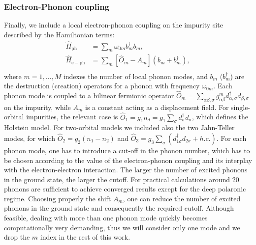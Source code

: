 \documentclass[edipack_sp.tex]{subfiles}
\begin{document}
\subsubsection{Electron-Phonon coupling}
Finally, we include a local electron-phonon coupling on the impurity site
described by the Hamiltonian terms: 
\begin{equation}\label{Hph}
  \begin{split}
    \hat{H}_\mathrm{ph}&=\sum_m \omega_{0m} b_m^\dagger b_m,   \\
    \hat{H}_\mathrm{e-ph} &= \sum_m [ \hat{O}_m - A_m](b_m+b_m^\dagger), \\
\end{split}
\end{equation}
where $m=1,\dots,M$ indexes the number of local phonon modes, and $b_m$
($b_m^\dagger$) are the destruction (creation) operators for a phonon with
frequency $\omega_{0m}$. Each phonon mode is coupled to a bilinear fermionic operator $\hat{O}_m= \sum_{\alpha \beta, \sigma }g^{m}_{\alpha \beta} d^\dagger_{\alpha, \sigma} d_{\beta, \sigma}$ on the impurity, while $A_m$ is a constant acting as a displacement field.  %
For single-orbital impurities, the relevant case is $\hat{O}_1 = g_1 n_d = g_1 \sum_{\sigma} d^{\dagger}_{\sigma}d_{\sigma}$, which defines the Holstein model\cite{Holstein1959APNY}. For two-orbital models we included also the two Jahn-Teller modes\cite{Capone2010ACMP}, for which $\hat{O}_2 = g_2(n_1 - n_2)$\cite{Scazzola2023PRB} and $\hat{O}_3 = g_3 \sum_{\sigma} (d^{\dagger}_{1\sigma}d_{2\sigma}+ h.c.)$. For each phonon mode, one has to introduce a cut-off in the phonon number, which has to be chosen according to the value of the electron-phonon coupling\cite{Capone2003PRL,Capone2006PRB} and its interplay with the electron-electron interaction\cite{Capone2004PRL_2,Sangiovanni2005PRB,Paci2005PRL,Sangiovanni2006PRL,Sangiovanni2006PRB_ph,Paci2006PRB}. The larger the number of excited phonons in the ground state, the larger the cutoff. For practical calculations around 20 phonons are sufficient to achieve converged results except for the deep polaronic regime\cite{Capone2003PRL}.
Choosing properly the shift $A_m$, one can reduce the number of excited phonons in the ground state and consequently the required cutoff. 
Although feasible, dealing with more than one phonon mode quickly becomes computationally very demanding, thus we will consider only one mode and we drop the $m$ index in the rest of this work.
\end{document}
